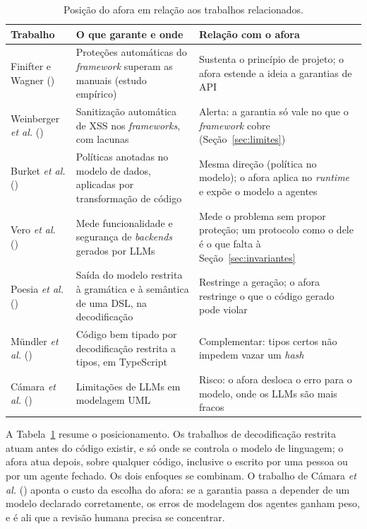 \documentclass[a4paper,12pt]{article}
\newcommand{\fonte}[1]{\par\vspace{2pt}{\centering\sffamily\footnotesize Fonte: #1\par}}
\newcommand{\estr}[1]{\textit{#1}}
\begin{document}
\begin{table}[ht]
\centering
\caption{Posição do afora em relação aos trabalhos relacionados.}\label{tab:relacionados}
\scriptsize
\renewcommand{\arraystretch}{1.15}
\begin{tabularx}{\linewidth}{>{\raggedright\arraybackslash}p{2.6cm}>{\raggedright\arraybackslash}X>{\raggedright\arraybackslash}X}
\toprule
Trabalho & O que garante e onde & Relação com o afora \\
\midrule
Finifter e Wagner (\citeyear{finifter2011}) & Proteções automáticas do \estr{framework} superam as manuais (estudo empírico) & Sustenta o princípio de projeto; o afora estende a ideia a garantias de API \\
Weinberger \textit{et al.} (\citeyear{weinberger2011}) & Sanitização automática de XSS nos \estr{frameworks}, com lacunas & Alerta: a garantia só vale no que o \estr{framework} cobre (Seção~\ref{sec:limites}) \\
Burket \textit{et al.} (\citeyear{burket2011}) & Políticas anotadas no modelo de dados, aplicadas por transformação de código & Mesma direção (política no modelo); o afora aplica no \estr{runtime} e expõe o modelo a agentes \\
Vero \textit{et al.} (\citeyear{vero2025}) & Mede funcionalidade e segurança de \estr{backends} gerados por LLMs & Mede o problema sem propor proteção; um protocolo como o dele é o que falta à Seção~\ref{sec:invariantes} \\
Poesia \textit{et al.} (\citeyear{poesia2022}) & Saída do modelo restrita à gramática e à semântica de uma DSL, na decodificação & Restringe a geração; o afora restringe o que o código gerado pode violar \\
Mündler \textit{et al.} (\citeyear{mundler2025}) & Código bem tipado por decodificação restrita a tipos, em TypeScript & Complementar: tipos certos não impedem vazar um \estr{hash} \\
Cámara \textit{et al.} (\citeyear{camara2023}) & Limitações de LLMs em modelagem UML & Risco: o afora desloca o erro para o modelo, onde os LLMs são mais fracos \\
\bottomrule
\end{tabularx}
\fonte{elaborado pelo autor (2026).}
\end{table}

A Tabela~\ref{tab:relacionados} resume o posicionamento. Os trabalhos de decodificação restrita atuam antes do código existir, e só onde se controla o modelo de linguagem; o afora atua depois, sobre qualquer código, inclusive o escrito por uma pessoa ou por um agente fechado. Os dois enfoques se combinam. O trabalho de Cámara \textit{et al.} (\citeyear{camara2023}) aponta o custo da escolha do afora: se a garantia passa a depender de um modelo declarado corretamente, os erros de modelagem dos agentes ganham peso, e é ali que a revisão humana precisa se concentrar.
\end{document}

